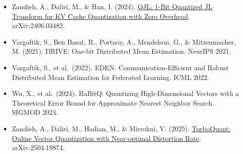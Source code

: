 \begin{itemize}
\tightlist
\item
  Zandieh, A., Daliri, M., \& Han, I. (2024). \href{https://arxiv.org/abs/2406.03482}{QJL: 1-Bit Quantized JL Transform for KV Cache Quantization with Zero Overhead}. arXiv:2406.03482.
\item
  Vargaftik, S., Ben Basat, R., Portnoy, A., Mendelson, G., \& Mitzenmacher, M. (2021). DRIVE: One-bit Distributed Mean Estimation. NeurIPS 2021.
\item
  Vargaftik, S., et al.~(2022). EDEN: Communication-Efficient and Robust Distributed Mean Estimation for Federated Learning. ICML 2022.
\item
  Wu, X., et al.~(2024). RaBitQ: Quantizing High-Dimensional Vectors with a Theoretical Error Bound for Approximate Nearest Neighbor Search. SIGMOD 2024.
\item
  Zandieh, A., Daliri, M., Hadian, M., \& Mirrokni, V. (2025). \href{https://arxiv.org/abs/2504.19874}{TurboQuant: Online Vector Quantization with Near-optimal Distortion Rate}. arXiv:2504.19874.
\end{itemize}

\clearpage
